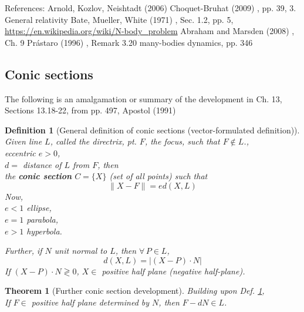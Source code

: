 \documentclass[10pt]{amsart}
\newtheorem{theorem}{Theorem}
\newtheorem{definition}{Definition}
\begin{document}
\begin{multicols*}{2}
References:
Arnold, Kozlov, Neishtadt (2006) \cite{AKN2006}
Choquet-Bruhat (2009) \cite{YChoquet-Bruhat2009}, pp. 39, 3. General relativity
Bate, Mueller, White (1971) \cite{BMW1971}, Sec. 1.2, pp. 5, \url{https://en.wikipedia.org/wiki/N-body_problem}
Abraham and Marsden (2008) \cite{AbMa2008}, Ch. 9
Pr\'{a}staro (1996) \cite{Pras1996}, Remark 3.20 many-bodies dynamics, pp. 346


\subsection{Conic sections}

The following is an amalgamation or summary of the development in Ch. 13, Sections 13.18-22, from pp. 497, Apostol (1991) \cite{Apos1991}

\begin{definition}[General definition of conic sections (vector-formulated definition)]\label{Def:ConicSectionsVectorFormulation}
Given line $L$, called the \emph{directrix}, pt. $F$, the \emph{focus}, such that $F \notin L$., \\
\phantom{Given} eccentric $e > 0$, \\
\phantom{Given} $d = $ distance of $L$ from $F$, then \\
the \textbf{conic section} $C = \lbrace X \rbrace$ (set of all points) such that 
\begin{equation}
\| X - F \| = ed(X, L)
\end{equation}
Now, \\
$e < 1 $ ellipse, \\
$e = 1$ parabola, \\
$e > 1$ hyperbola.

Further, if $N$ unit normal to $L$, then $\forall \, P \in L$, 
\begin{equation}
d(X, L) = | (X- P) \cdot N |
\end{equation}
If $(X- P) \cdot N \gtrless 0$, $X \in $ positive half plane (negative half-plane). \\
\end{definition} 

\begin{theorem}[Further conic section development]\label{Thm:MoreConicSectionsFromVectorFormulation}
	Building upon Def. \ref{Def:ConicSectionsVectorFormulation}, \\
	
	If $F \in $ positive half plane determined by $N$, then $F -d N \in L$.  \\
	

\end{theorem}
\end{multicols*}
\end{document}
